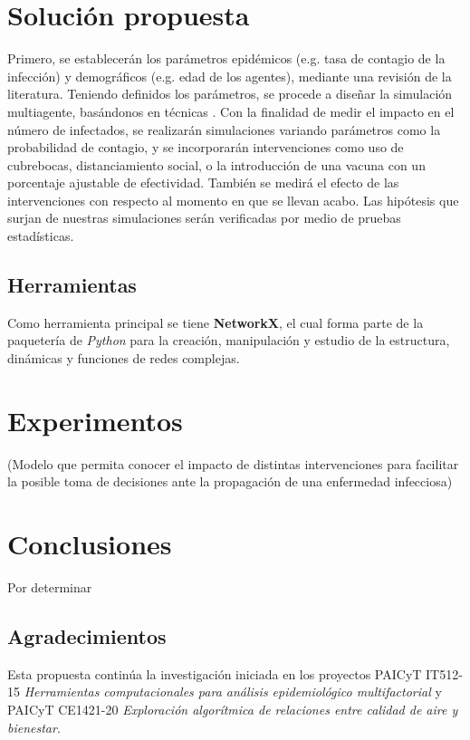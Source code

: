 \documentclass[a4]{sciposter}
\begin{document}
\begin{multicols}{2}
\section{Solución propuesta}

Primero, se establecerán los parámetros epidémicos (e.g. tasa de contagio de la infección) y demográficos (e.g. edad de los agentes), mediante una revisión de la literatura. Teniendo definidos los parámetros, se procede a diseñar la simulación multiagente, basándonos en técnicas \citet{existentes}. Con la finalidad de medir el impacto en el número de infectados, se realizarán simulaciones variando parámetros como la probabilidad
de contagio, y se incorporarán intervenciones como uso de cubrebocas, distanciamiento social, o la introducción de una vacuna con un porcentaje ajustable de efectividad. También se medirá el efecto de las intervenciones con respecto al momento en que se llevan acabo. Las hipótesis que surjan de nuestras simulaciones serán verificadas por medio de pruebas estadísticas.

\subsection*{Herramientas}

Como herramienta principal se tiene \textbf{NetworkX}, el cual forma parte de la paquetería de \emph{Python} para la creación, manipulación y estudio de la estructura, dinámicas y funciones de redes complejas.

\section{Experimentos}

(Modelo que permita conocer el impacto de distintas intervenciones para facilitar la posible toma de decisiones ante la propagación de una enfermedad infecciosa)

\section{Conclusiones}

Por determinar

\subsection*{Agradecimientos}

{\small Esta propuesta continúa la investigación iniciada en los proyectos PAICyT IT512-15 \emph{Herramientas computacionales para análisis epidemiológico multifactorial} y PAICyT CE1421-20 \emph{Exploración algorítmica de relaciones entre calidad de aire y bienestar}.
    
}
\end{multicols}
\end{document}
